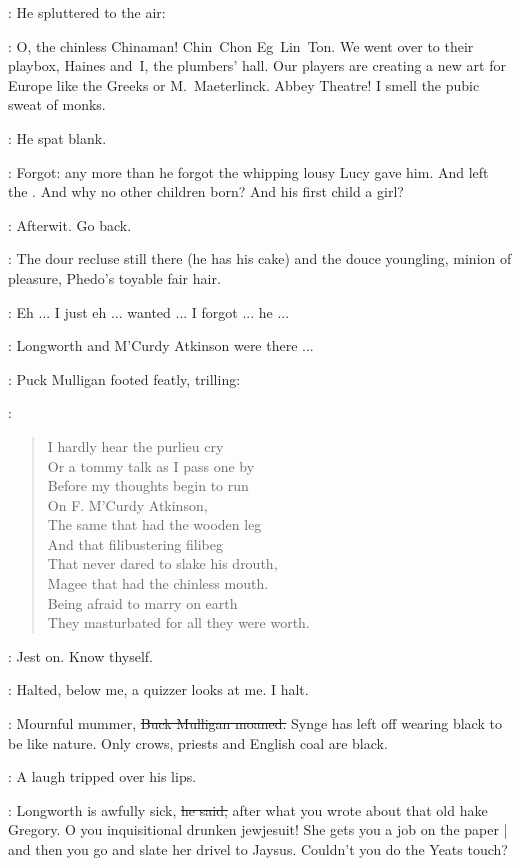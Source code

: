 :
He spluttered to the air:

\mulligan:
O, the chinless Chinaman!
Chin~Chon Eg~Lin~Ton.
We went over to their playbox,
Haines and~I,
the plumbers' hall.
Our players are creating a new art for Europe
like the Greeks or M.~Maeterlinck.
Abbey Theatre!
I smell the pubic sweat of monks.

:
He spat blank.

\StephenInt:
Forgot:
any more than he forgot the whipping lousy Lucy gave him.
And left the .
And why no other children born?
And his first child a girl?

\StephenInt:
Afterwit.
Go back.

\StephenInt:
The dour recluse still there (he has his cake)
and the douce youngling,
minion of pleasure,
Phedo's toyable fair hair.

\StephenInt:
Eh ...
I just eh ...
wanted ...
I forgot ...
he ...

\mulligan:
Longworth and M'Curdy Atkinson were there ...

:
Puck Mulligan footed featly,
trilling:

\mulligan:
\begin{verse}
    I hardly hear the purlieu cry \\
    Or a tommy talk as I pass one by \\
    Before my thoughts begin to run \\
    On F. M'Curdy Atkinson, \\
    The same that had the wooden leg \\
    And that filibustering filibeg \\
    That never dared to slake his drouth, \\
    Magee that had the chinless mouth.
 \\
    Being afraid to marry on earth \\
    They masturbated for all they were worth.
\end{verse}

\StephenInt:
Jest on.
Know thyself.

\StephenInt:
Halted,
below me,
a quizzer looks at me.
I halt.

\mulligan:
Mournful mummer,
\sout{Buck Mulligan moaned.}
Synge has left off wearing black to be like nature.
Only crows, priests and English coal are black.

:
A laugh tripped over his lips.

\mulligan:
Longworth is awfully sick,
\sout{he said,}
after what you wrote about that old hake Gregory.
O you inquisitional drunken jewjesuit!
She gets you a job on the paper |
and then you go and slate her drivel to Jaysus.
Couldn't you do the Yeats touch?

